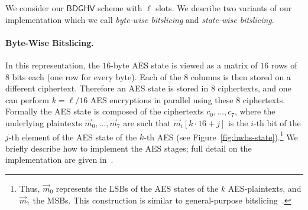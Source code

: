 \documentclass{llncs}
\newcommand*{\BDGHV}{\ensuremath{\mathsf{BDGHV}}}
\newcommand*\bwbs{byte-wise bitslicing\xspace}
\newcommand*\swbs{state-wise bitslicing\xspace}
\begin{document}
We consider our $\BDGHV$ scheme with $\ell$ slots. We describe two
variants of our implementation which we call \emph{\bwbs} and
\emph{\swbs}.

\paragraph{Byte-Wise Bitslicing.} In this representation, the
$16$-byte AES state is viewed as a matrix of $16$ rows of $8$ bits
each (one row for every byte). Each of the $8$ columns is then stored on a different
ciphertext. Therefore an AES state is stored in $8$
ciphertexts, and one can perform
$k=\ell/16$ AES encryptions in parallel using these $8$
ciphertexts. Formally the AES state is composed of the ciphertexts $c_0,\ldots,c_7$, where
the underlying plaintexts $\vec m_0,\ldots,\vec m_7$ are such that
$\vec m_i[k\cdot 16+j]$ is the $i$-th bit of the $j$-th element of the AES
state of the $k$-th AES (see Figure~\ref{fig:bwbs-state}).\footnote{
Thus, $\vec m_0$ represents the LSBs
  of the AES states of the $k$ AES-plaintexts, and $\vec m_7$ the
  MSBs. This construction is similar to general-purpose
  bitslicing~\cite{Bih1997,KS2009}.} We briefly
describe how to implement the AES stages; full detail 
on the implementation are given in~\cite{CLT2013a}. 
\end{document}
